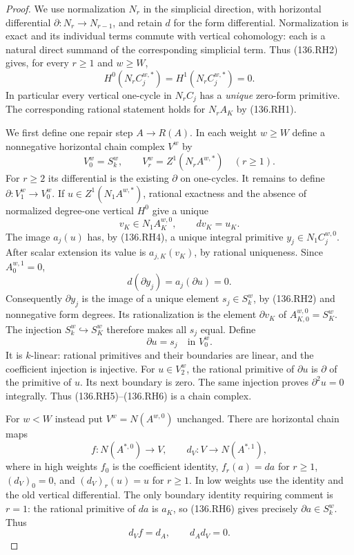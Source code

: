 \begin{proof}
We use normalization $N_r$ in the simplicial direction, with
horizontal differential $\partial:N_r\to N_{r-1}$, and retain
$d$ for the form differential. Normalization is exact and its
individual terms commute with vertical cohomology: each is a
natural direct summand of the corresponding simplicial term.
Thus (136.RH2) gives, for every $r\ge1$ and $w\ge W$,
\[
 H^0(N_r C_j^{w,*})=H^1(N_r C_j^{w,*})=0.
                                                               \tag{136.RH4}
\]
In particular every vertical one-cycle in $N_rC_j$ has a
\emph{unique} zero-form primitive. The corresponding rational
statement holds for $N_r A_K$ by (136.RH1).

We first define one repair step $A\to R(A)$.
In each weight $w\ge W$ define a nonnegative horizontal chain
complex $V^w$ by
\[
 V_0^w=S_k^w,\qquad
 V_r^w=Z^1(N_r A^{w,*})\quad(r\ge1).                       \tag{136.RH5}
\]
For $r\ge2$ its differential is the existing $\partial$ on
one-cycles. It remains to define $\partial:V_1^w\to V_0^w$.
If $u\in Z^1(N_1 A^{w,*})$, rational exactness and the absence
of normalized degree-one vertical $H^0$ give a unique
\[
 v_K\in N_1 A_K^{w,0},\qquad d v_K=u_K.
\]
The image $a_j(u)$ has, by (136.RH4), a unique integral primitive
$y_j\in N_1 C_j^{w,0}$. After scalar extension its value is
$a_{j,K}(v_K)$, by rational uniqueness. Since $A_0^{w,1}=0$,
\[
             d(\partial y_j)=a_j(\partial u)=0.
\]
Consequently $\partial y_j$ is the image of a unique element
$s_j\in S_k^w$, by (136.RH2) and nonnegative form degrees.
Its rationalization is the element $\partial v_K$ of
$A_{K,0}^{w,0}=S_K^w$. The injection $S_k^w\hookrightarrow S_K^w$
therefore makes all $s_j$ equal. Define
\[
                         \partial u=s_j\quad\text{in }V_0^w.
                                                               \tag{136.RH6}
\]
It is $k$-linear: rational primitives and their boundaries are
linear, and the coefficient injection is injective.
For $u\in V_2^w$, the rational primitive of $\partial u$ is
$\partial$ of the primitive of $u$. Its next boundary is zero.
The same injection proves $\partial^2u=0$ integrally.
Thus (136.RH5)--(136.RH6) is a chain complex.

For $w<W$ instead put $V^w=N(A^{w,0})$ unchanged.
There are horizontal chain maps
\[
 f:N(A^{*,0})\longrightarrow V,
             \qquad d_V:V\longrightarrow N(A^{*,1}),      \tag{136.RH7}
\]
where in high weights $f_0$ is the coefficient identity,
$f_r(a)=da$ for $r\ge1$, $(d_V)_0=0$, and $(d_V)_r(u)=u$
for $r\ge1$. In low weights use the identity and the old
vertical differential. The only boundary identity requiring
comment is $r=1$: the rational primitive of $da$ is $a_K$,
so (136.RH6) gives precisely $\partial a\in S_k^w$.
Thus
\[
                         d_Vf=d_A,\qquad d_A d_V=0.
                                                               \tag{136.RH8}
\]


\end{proof}
